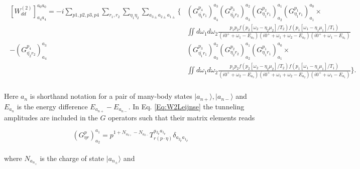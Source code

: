 \documentclass{article}
\newcommand{\ket}[1]{\ensuremath{|#1\rangle}}
\begin{document}
\begin{align}
	\begin{split}
    \left [ W^{(2)}_{dd} \right ]^{a_0a_0}_{a_4a_4} = -i \sum_{p1,p2,p3,p4}\sum_{r_1,r_2}\sum_{\eta_1\eta_2}\sum_{a_{3\pm}a_{2\pm}a_{1\pm}} \Bigg \{ &
     \left  (G^{p_4}_{\bar{\eta_1}r_1}\right)^{a_3}_{a_4} \left (G^{p_3}_{\bar{\eta_2}r_2}\right)^{a_2}_{a_3}  \left (G^{p_2}_{\eta_1r_1}\right)^{a_1}_{a_2}  \left (G^{p_1}_{\eta_1r_1}\right)^{a_0}_{a_1} \times \\ 
     &\iint d\omega_1 d\omega_2 \frac{p_1p_2f(p_2[\omega_2-\eta_2\mu_2]/T_2)f(p_1[\omega_1-\eta_1\mu_1]/T_1)}{(i0^++\omega_1-E_{a_3})(i0^++\omega_1 + \omega_2-E_{a_2})(i0^++\omega_1-E_{a_1})}\\
      - \left (G^{p_4}_{\bar{\eta_2}r_2}\right)^{a_3}_{a_4} &\left (G^{p_3}_{\bar{\eta_1}r_1}\right)^{a_2}_{a_3}  \left (G^{p_2}_{\eta_2r_2}\right)^{a_1}_{a_2}  \left (G^{p_1}_{\eta_1r_1}\right)^{a_0}_{a_1} \times \\
        &\iint d\omega_1d\omega_2 \frac{p_1p_2f(p_2[\omega_2-\eta_2\mu_2]/T_2)f(p_1[\omega_1-\eta_1\mu_1]/T_1)}{(i0^++\omega_2-E_{a_3})(i0^++\omega_1 + \omega_2-E_{a_2})(i0^++\omega_1-E_{a_1})}  \Bigg \}.
	\end{split}
    \label{Eq:W2Leijnse}
\end{align}
\\
Here $a_n$ is shorthand notation for a pair of many-body states $\ket{a_{n+}}, \ket{a_{n-}}$ and $E_{a_n}$ is the energy difference $E_{a_{n+}}-E_{a_{n-}}$. In Eq. \ref{Eq:W2Leijnse} the tunneling amplitudes are included in the $G$ operators such that their matrix elements reads

\begin{equation}
    \left ( G^{p}_{\eta r}\right )^{a_1}_{a_2} = p^{1+ N_{a_{2+}}-N_{a_{2-}}} T^{a_{2_p}a_{1_p}}_{r(p\cdot\eta)}\delta_{a_{2_{\bar{p}}}a_{1_{\bar{p}}}}
\end{equation}
\\
where $N_{a_{n_\pm}}$ is the charge of state $\ket{a_{n_\pm}}$ and 
\end{document}
